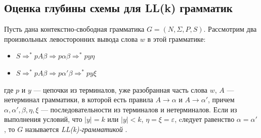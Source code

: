 \subsection{Оценка глубины схемы для LL(k) грамматик}
Пусть дана контекстно-свободная грамматика  $G = (N, \Sigma, P, S)$. Рассмотрим два произвольных левосторонних вывода слова $w$ в этой грамматике:
\begin{itemize}
	\item $S \Rightarrow^* pA\beta \Rightarrow p \alpha \beta  \Rightarrow^*  py \eta$
	\item $S \Rightarrow^* pA\beta \Rightarrow p \alpha' \beta  \Rightarrow^*  py \xi$
\end{itemize}
где $p$ и $y$ --- цепочки из терминалов, уже разобранная часть слова $w$, $A$ --- нетерминал грамматики, в которой есть правила $A \rightarrow \alpha$ и $A \rightarrow \alpha'$, причем $\alpha, \alpha', \beta, \eta, \xi$ --- последовательности из терминалов и нетерминалов. Если из выполнения условий, что $|y| = k$ или $|y| < k$, $\eta = \xi = \varepsilon$, cледует равенство $\alpha = \alpha'$, то $G$ называется \textit{LL(k)-грамматикой} \cite{LL}.

